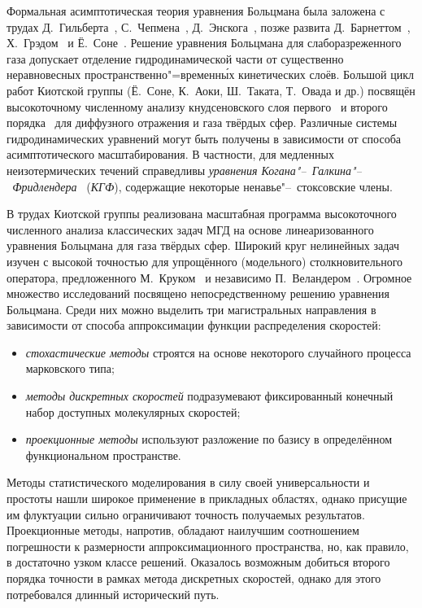 {\progress}

Формальная асимптотическая теория уравнения Больцмана была заложена с трудах Д.~Гильберта~\autocite{Hilbert1912},
С.~Чепмена~\autocite{Chapman1916}, Д.~Энскога~\autocite{Enskog1917},
позже развита Д.~Барнеттом~\autocite{Burnett1935}, Х.~Грэдом~\autocite{Grad1963a} и Ё.~Соне~\autocite{Sone2002}.
Решение уравнения Больцмана для слаборазреженного газа допускает отделение гидродинамической части
от существенно неравновесных пространственно"=временн\'{ы}х кинетических слоёв.
Большой цикл работ Киотской группы (Ё.~Соне, К.~Аоки, Ш.~Таката, Т.~Овада и др.)
посвящён высокоточному численному анализу кнудсеновского слоя первого~\autocite{Ohwada1989creep, Ohwada1989jump}
и второго порядка~\autocite{Ohwada1992, Takata2015second, Takata2015curvature}
для диффузного отражения и газа твёрдых сфер.
Различные системы гидродинамических уравнений могут быть получены в зависимости от способа асимптотического масштабирования.
В частности, для медленных неизотермических течений справедливы
\emph{уравнения Когана"--~Галкина"--~Фридлендера}~\autocite{Kogan1976} (\emph{КГФ}),
содержащие некоторые ненавье"--~стоксовские члены.

В трудах Киотской группы реализована масштабная программа высокоточного численного анализа классических задач МГД
на основе линеаризованного уравнения Больцмана для газа твёрдых сфер.
Широкий круг нелинейных задач изучен с высокой точностью для упрощённого (модельного) столкновительного оператора,
предложенного М.~Круком~\autocite{Krook1954} и независимо П.~Веландером~\autocite{Welander1954}.
Огромное множество исследований посвящено непосредственному решению уравнения Больцмана.
Среди них можно выделить три магистральных направления в зависимости от способа аппроксимации
функции распределения скоростей:
\begin{itemize}
    \item \emph{стохастические методы} строятся на основе некоторого случайного процесса марковского типа;
    \item \emph{методы дискретных скоростей} подразумевают фиксированный конечный набор доступных молекулярных скоростей;
    \item \emph{проекционные методы} используют разложение по базису в определённом функциональном пространстве.
\end{itemize}
Методы статистического моделирования в силу своей универсальности и простоты нашли широкое применение в прикладных областях,
однако присущие им флуктуации сильно ограничивают точность получаемых результатов.
Проекционные методы, напротив, обладают наилучшим соотношением погрешности к размерности аппроксимационного пространства,
но, как правило, в достаточно узком классе решений.
Оказалось возможным добиться второго порядка точности в рамках метода дискретных скоростей,
однако для этого потребовался длинный исторический путь.

